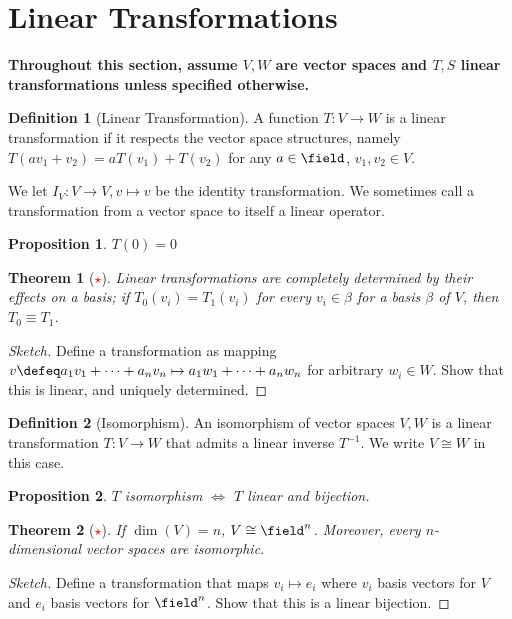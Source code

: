 \documentclass[12pt, oneside]{article}
\theoremstyle{definition}
\newtheorem{defn}{Definition}
\theoremstyle{plain}
\newtheorem{thm}{Theorem}
\newtheorem{prop}{Proposition}
\theoremstyle{remark}
\let\origsection=\section
\renewcommand\section[1]{\origsection{#1}\label{sec:\thesection}}
\begin{document}
\section{Linear Transformations}
\begin{center}
\textbf{Throughout this section, assume $V, W$ are vector spaces and $T, S$ linear transformations unless specified otherwise.}
\end{center}
\begin{defn}[Linear Transformation]
  A function $T : V \to W$ is a linear transformation if it respects the vector space structures, namely $T(a v_1 + v_2) =a T(v_1) + T(v_2)$ for any $a\in \field$, $v_1, v_2 \in V$.

  We let $I_V : V \to V, v \mapsto v$ be the identity transformation. We sometimes call a transformation from a vector space to itself a linear operator.
\end{defn}

\begin{prop}
  $T(0) =0$
\end{prop}

\begin{thm}[\textcolor{red}{$\star$}]
  Linear transformations are completely determined by their effects on a basis; if $T_0(v_i) = T_1(v_i)$ for every $v_i \in \beta$ for a basis $\beta$ of $V$, then $T_0 \equiv T_1$.
\end{thm}

\begin{proof}[Sketch]
  Define a transformation as mapping $v \defeq a_1 v_1 + \cdots + a_n v_n \mapsto a_1 w_1 + \cdots + a_n w_n$ for arbitrary $w_i \in W$. Show that this is linear, and uniquely determined.
\end{proof}

\begin{defn}[Isomorphism]
  An isomorphism of vector spaces $V, W$ is a linear transformation $T : V\to W$ that admits a linear inverse $T^{-1}$. We write $V \cong W$ in this case.
\end{defn}
\begin{prop}
  $T$ isomorphism $\iff$ $T$ linear and bijection.
\end{prop}

\begin{thm}[\textcolor{red}{$\star$}]
  If $\dim(V) = n$, $V \cong \field^n$. Moreover, every $n$-dimensional vector spaces are isomorphic.
\end{thm}

\begin{proof}[Sketch]
  Define a transformation that maps $v_i \mapsto e_i$ where $v_i$ basis vectors for $V$ and $e_i$ basis vectors for $\field^n$. Show that this is a linear bijection.
\end{proof}
\end{document}
